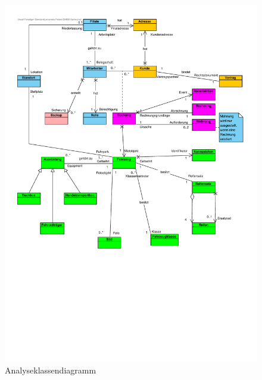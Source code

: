 \begin{figure}[!ht]
    \centering
    \includegraphics[width=\textwidth, trim = 0cm 9cm 0cm 0cm]{Bilder/Diagramme/Analyseklassendiagramm.pdf}
    \caption{Analyseklassendiagramm}
    \label{img:akd}
\end{figure}